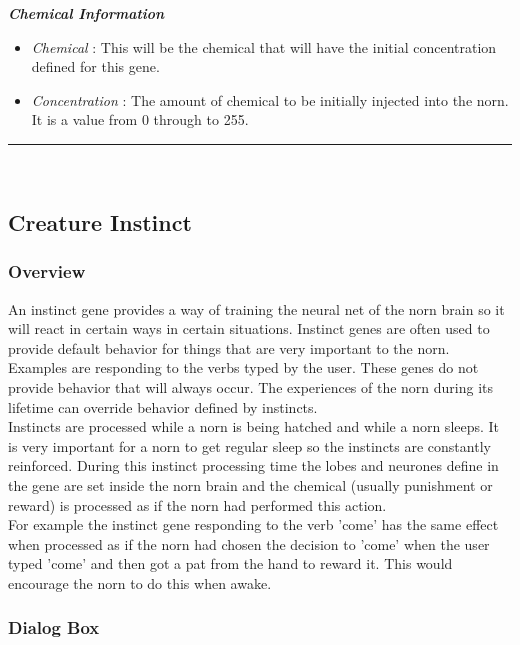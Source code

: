 \documentclass[11pt,twoside,a4paper]{article}
\begin{document}
\textbf{\textit{Chemical Information}}
\begin{itemize}
	\item[] \emph{Chemical} : This will be the chemical that will have the initial concentration defined for this gene.
	\item[] \emph{Concentration} : The amount of chemical to be initially injected into the norn. It is a value from 0 through to 255.
\end{itemize}

\rule{10cm}{0.5mm}~\\

\subsection{Creature Instinct} %

\subsubsection{Overview}

An instinct gene provides a way of training the neural net of the norn brain so it will react in certain ways in certain situations. Instinct genes are often used to provide default behavior for things that are very important to the norn. Examples are responding to the verbs typed by the user. These genes do not provide behavior that will always occur. The experiences of the norn during its lifetime can override behavior defined by instincts.~\\

Instincts are processed while a norn is being hatched and while a norn sleeps. It is very important for a norn to get regular sleep so the instincts are constantly reinforced. During this instinct processing time the lobes and neurones define in the gene are set inside the norn brain and the chemical (usually punishment or reward) is processed as if the norn had performed this action.~\\

For example the instinct gene responding to the verb 'come' has the same effect when processed as if the norn had chosen the decision to 'come' when the user typed 'come' and then got a pat from the hand to reward it. This would encourage the norn to do this when awake.

\clearpage

\subsubsection{Dialog Box}
\end{document}
